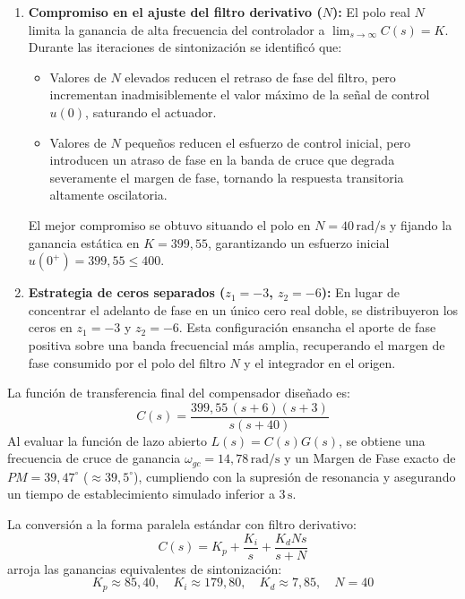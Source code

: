 \begin{enumerate}
  \item \textbf{Compromiso en el ajuste del filtro derivativo ($N$):}
  El polo real $N$ limita la ganancia de alta frecuencia del controlador a $\lim_{s \to \infty} C(s) = K$. Durante las iteraciones de sintonización se identificó que:
  \begin{itemize}
    \item Valores de $N$ elevados reducen el retraso de fase del filtro, pero incrementan inadmisiblemente el valor máximo de la señal de control $u(0)$, saturando el actuador.
    \item Valores de $N$ pequeños reducen el esfuerzo de control inicial, pero introducen un atraso de fase en la banda de cruce que degrada severamente el margen de fase, tornando la respuesta transitoria altamente oscilatoria.
  \end{itemize}
  El mejor compromiso se obtuvo situando el polo en $N = 40\,\mathrm{rad/s}$ y fijando la ganancia estática en $K = 399{,}55$, garantizando un esfuerzo inicial $u(0^+) = 399{,}55 \le 400$.

  \item \textbf{Estrategia de ceros separados ($z_1 = -3$, $z_2 = -6$):}
  En lugar de concentrar el adelanto de fase en un único cero real doble, se distribuyeron los ceros en $z_1 = -3$ y $z_2 = -6$. Esta configuración ensancha el aporte de fase positiva sobre una banda frecuencial más amplia, recuperando el margen de fase consumido por el polo del filtro $N$ y el integrador en el origen.
\end{enumerate}

La función de transferencia final del compensador diseñado es:
\begin{equation}
  C(s) = \frac{399{,}55\,(s + 6)(s + 3)}{s(s + 40)}
  \label{eq:controlador_disenado}
\end{equation}
Al evaluar la función de lazo abierto $L(s) = C(s)G(s)$, se obtiene una frecuencia de cruce de ganancia $\omega_{gc} = 14{,}78\,\mathrm{rad/s}$ y un Margen de Fase exacto de $PM = 39{,}47^\circ$ ($\approx 39{,}5^\circ$), cumpliendo con la supresión de resonancia y asegurando un tiempo de establecimiento simulado inferior a $3\,\mathrm{s}$.

La conversión a la forma paralela estándar con filtro derivativo:
\begin{equation}
  C(s) = K_p + \frac{K_i}{s} + \frac{K_d N s}{s + N}
\end{equation}
arroja las ganancias equivalentes de sintonización:
\begin{equation}
  K_p \approx 85{,}40, \quad K_i \approx 179{,}80, \quad K_d \approx 7{,}85, \quad N = 40
\end{equation}

